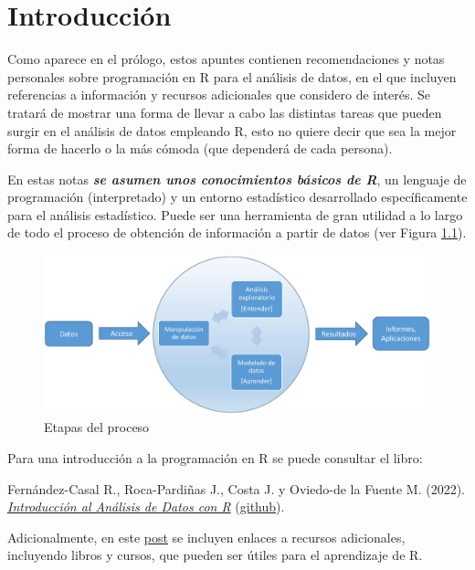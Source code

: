 \documentclass[
]{book}
\theoremstyle{break}
\theoremstyle{nonumberplain}
\begin{document}
\hypertarget{intro}{%
\chapter{Introducción}\label{intro}}

Como aparece en el prólogo, estos apuntes contienen recomendaciones y notas personales sobre programación en R para el análisis de datos, en el que incluyen referencias a información y recursos adicionales que considero de interés.
Se tratará de mostrar una forma de llevar a cabo las distintas tareas que pueden surgir en el análisis de datos empleando R, esto no quiere decir que sea la mejor forma de hacerlo o la más cómoda (que dependerá de cada persona).

En estas notas \textbf{\emph{se asumen unos conocimientos básicos de R}}, un lenguaje de programación (interpretado) y un entorno estadístico desarrollado específicamente para el análisis estadístico.
Puede ser una herramienta de gran utilidad a lo largo de todo el proceso de obtención de información a partir de datos (ver Figura \ref{fig:esquema}).

\begin{figure}[!htb]

{\centering \includegraphics[width=0.8\linewidth]{figuras/esquema2} 

}

\caption{Etapas del proceso}\label{fig:esquema}
\end{figure}

Para una introducción a la programación en R se puede consultar el libro:

Fernández-Casal R., Roca-Pardiñas J., Costa J. y Oviedo-de la Fuente M. (2022). \emph{\href{https://rubenfcasal.github.io/intror}{Introducción al Análisis de Datos con R}} (\href{https://github.com/rubenfcasal/intror}{github}).

Adicionalmente, en este \href{https://rubenfcasal.github.io/post/ayuda-y-recursos-para-el-aprendizaje-de-r}{post} se incluyen enlaces a recursos adicionales, incluyendo libros y cursos, que pueden ser útiles para el aprendizaje de R.
\end{document}
